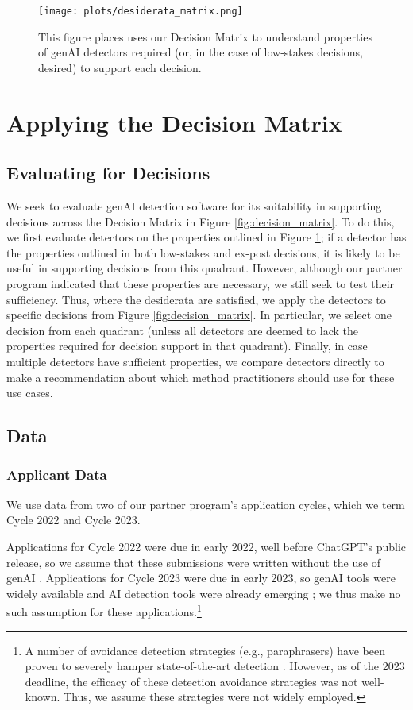 \begin{figure}[htbp]
  \centering
  \texttt{[image: plots/desiderata\_matrix.png]}
  \caption{This figure places uses our Decision Matrix to understand properties of genAI detectors required (or, in the case of low-stakes decisions, desired) to support each decision.}
  \label{fig:desiderata_matrix}
\end{figure}

\section{Applying the Decision Matrix}\label{sec:data}
\subsection{Evaluating for Decisions}
We seek to evaluate genAI detection software for its suitability in supporting decisions across the Decision Matrix in Figure \ref{fig:decision_matrix}. To do this, we first evaluate detectors on the properties outlined in Figure \ref{fig:desiderata_matrix}; if a detector has the properties outlined in both low-stakes and ex-post decisions, it is likely to be useful in supporting decisions from this quadrant. However, although our partner program indicated that these properties are necessary, we still seek to test their sufficiency. Thus, where the desiderata are satisfied, we apply the detectors to specific decisions from Figure \ref{fig:decision_matrix}. In particular, we select one decision from each quadrant (unless all detectors are deemed to lack the properties required for decision support in that quadrant). Finally, in case multiple detectors have sufficient properties, we compare detectors directly to make a recommendation about which method practitioners should use for these use cases.

\subsection{Data}
\subsubsection{Applicant Data}\label{sssec:applicant_data}
We use data from two of our partner program's application cycles, which we term Cycle 2022 and Cycle 2023.

Applications for Cycle 2022 were due in early 2022, well before ChatGPT's public release, so we assume that these submissions were written without the use of genAI \cite{openai_gpt-4_2023}. Applications for Cycle 2023 were due in early 2023, so genAI tools were widely available and AI detection tools were already emerging \cite{kirchner_new_2023,gptzero_gptzero_2023,liu_deid-gpt_2023}; we thus make no such assumption for these applications.\footnote{A number of avoidance detection strategies (e.g., paraphrasers) have been proven to severely hamper state-of-the-art detection \cite{kalpesh_krishna_paraphrasing_2023}. However, as of the 2023 deadline, the efficacy of these detection avoidance strategies was not well-known. Thus, we assume these strategies were not widely employed.}


